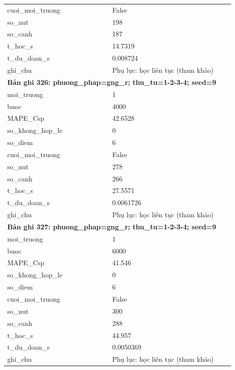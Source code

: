 \begin{longtable}{p{0.43\linewidth}p{0.50\linewidth}}
cuoi\_\allowbreak moi\_\allowbreak truong & False \\
so\_\allowbreak nut & 198 \\
so\_\allowbreak canh & 187 \\
t\_\allowbreak hoc\_\allowbreak s & 14.7319 \\
t\_\allowbreak du\_\allowbreak doan\_\allowbreak s & 0.008724 \\
ghi\_\allowbreak chu & Phụ lục: học liên tục (tham khảo) \\
\midrule
\multicolumn{2}{p{0.95\linewidth}}{\textbf{Bản ghi 326: phuong\_phap=gng\_r; thu\_tu=1-2-3-4; seed=9}} \\
moi\_\allowbreak truong & 1 \\
buoc & 4000 \\
MAPE\_\allowbreak Csp & 42.6528 \\
so\_\allowbreak khong\_\allowbreak hop\_\allowbreak le & 0 \\
so\_\allowbreak diem & 6 \\
cuoi\_\allowbreak moi\_\allowbreak truong & False \\
so\_\allowbreak nut & 278 \\
so\_\allowbreak canh & 266 \\
t\_\allowbreak hoc\_\allowbreak s & 27.5571 \\
t\_\allowbreak du\_\allowbreak doan\_\allowbreak s & 0.0061726 \\
ghi\_\allowbreak chu & Phụ lục: học liên tục (tham khảo) \\
\midrule
\multicolumn{2}{p{0.95\linewidth}}{\textbf{Bản ghi 327: phuong\_phap=gng\_r; thu\_tu=1-2-3-4; seed=9}} \\
moi\_\allowbreak truong & 1 \\
buoc & 6000 \\
MAPE\_\allowbreak Csp & 41.546 \\
so\_\allowbreak khong\_\allowbreak hop\_\allowbreak le & 0 \\
so\_\allowbreak diem & 6 \\
cuoi\_\allowbreak moi\_\allowbreak truong & False \\
so\_\allowbreak nut & 300 \\
so\_\allowbreak canh & 288 \\
t\_\allowbreak hoc\_\allowbreak s & 44.957 \\
t\_\allowbreak du\_\allowbreak doan\_\allowbreak s & 0.0050369 \\
ghi\_\allowbreak chu & Phụ lục: học liên tục (tham khảo) \\

\end{longtable}
